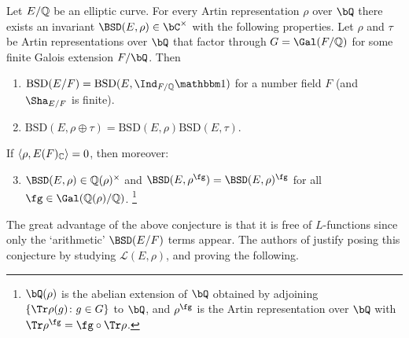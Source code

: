 \begin{conj}{\cite[Conjecture 4]{DEW1}}\label{conj_4}
    Let $E/\mathbb{Q}$ be an elliptic curve. 
    For every Artin representation $\rho$ over $\bQ$ there exists an invariant $\BSD(E, \rho) \in \bC^{\times}$ with the following properties. 
    Let $\rho$ and $\tau$ be Artin representations over $\bQ$ that factor through $G = \Gal(F/\QQ)$ for some finite Galois extension $F / \bQ$. Then 
    \begin{enumerate}[label={\bfseries C\arabic*.}]
        \setlength\itemsep{0em}
        \item $\mathrm{BSD}(E/F)=\mathrm{BSD}(E,\Ind_{F/\QQ}\trivial)$ for a number field $F$ (and $\Sha_{E/F}$ is finite).
        \item $\mathrm{BSD}(E,\rho\oplus\tau)=\mathrm{BSD}(E,\rho)\mathrm{BSD}(E,\tau)$.
    \end{enumerate}       
        If $\langle\rho,E(F)_{\mathbb{C}}\rangle=0$, then moreover:
    \begin{enumerate}[label={\bfseries C\arabic*.}]
        \setcounter{enumi}{2}
       \item $\BSD(E,\rho)\in\QQ(\rho)^{\times}$ and $\BSD(E,\rho^{\fg})=\BSD(E,\rho)^{\fg}$ for all $\fg\in\Gal(\QQ(\rho)/\QQ)$. \footnote{$\bQ(\rho)$ is the abelian extension of $\bQ$ obtained by adjoining $\{\Tr \rho (g) \colon g \in G \}$ to $\bQ$, and $\rho^{\fg}$ is the Artin representation over $\bQ$ with $\Tr \rho^{\fg} = \fg \circ \Tr \rho$. }
    \end{enumerate}
\end{conj}

The great advantage of the above conjecture is that it is free of $L$-functions since only the `arithmetic' $\BSD(E/F)$ terms appear. The authors of \cite{DEW1} justify posing this conjecture by studying $\mathcal{L}(E, \rho)$, and proving the following.

